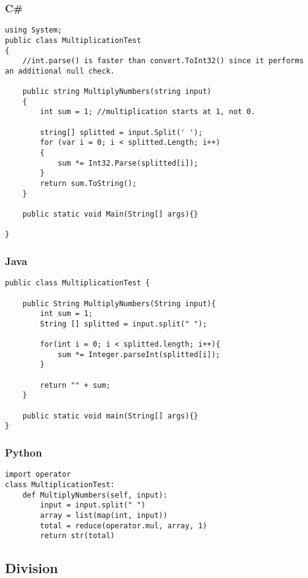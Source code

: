 \subsubsection{C\#}
\lstset{style=sharpc}
\begin{lstlisting}
using System;
public class MultiplicationTest
{
    //int.parse() is faster than convert.ToInt32() since it performs an additional null check.

    public string MultiplyNumbers(string input)
    {
        int sum = 1; //multiplication starts at 1, not 0.

        string[] splitted = input.Split(' ');
        for (var i = 0; i < splitted.Length; i++)
        {
            sum *= Int32.Parse(splitted[i]);
        }
        return sum.ToString();
    }

	public static void Main(String[] args){}

}
\end{lstlisting}

\subsubsection{Java}
\lstset{style=java}
\begin{lstlisting}
public class MultiplicationTest {

	public String MultiplyNumbers(String input){
		int sum = 1;
		String [] splitted = input.split(" ");

		for(int i = 0; i < splitted.length; i++){
			sum *= Integer.parseInt(splitted[i]);
		}

		return "" + sum;
	}

	public static void main(String[] args){}
}
\end{lstlisting}


\subsubsection{Python}
\lstset{style=python}
\begin{lstlisting}
import operator
class MultiplicationTest:
    def MultiplyNumbers(self, input):
        input = input.split(" ")
        array = list(map(int, input))
        total = reduce(operator.mul, array, 1)
        return str(total)
\end{lstlisting}



\subsection{Division}


